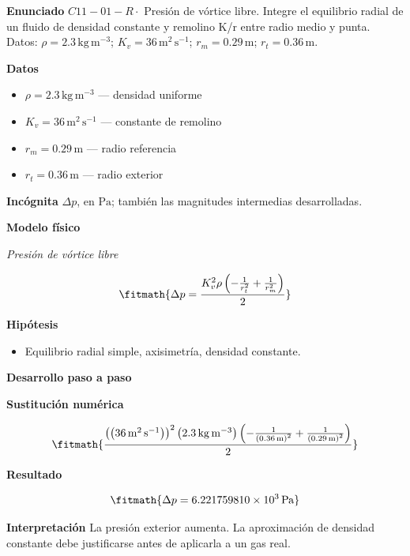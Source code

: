 \documentclass[10pt,openany]{book}
\begin{document}
\begin{tcolorbox}[title={Problema resuelto 1}, studiumworked, breakable]

\noindent\textbf{Enunciado}
\(C11-01-R \cdot\) Presión de vórtice libre. Integre el equilibrio radial de un fluido de densidad constante y remolino K/r entre radio medio y punta. Datos: \(\rho=2.3\, \mathrm{kg}\,\mathrm{m}^{-3}\); \(K_v=36\, \mathrm{m}^{2}\,\mathrm{s}^{-1}\); \(r_m=0.29\, \mathrm{m}\); \(r_t=0.36\, \mathrm{m}\).

\noindent\textbf{Datos}
\begin{itemize}
\item $\rho = 2.3\,\mathrm{kg}\,\mathrm{m}^{-3}$ — densidad uniforme
\item $K_v = 36\,\mathrm{m}^{2}\,\mathrm{s}^{-1}$ — constante de remolino
\item $r_m = 0.29\,\mathrm{m}$ — radio referencia
\item $r_t = 0.36\,\mathrm{m}$ — radio exterior
\end{itemize}

\noindent\textbf{Incógnita}
$\Delta p$, en $\mathrm{Pa}$; también las magnitudes intermedias desarrolladas.

\noindent\textbf{Modelo físico}

\noindent\textit{Presión de vórtice libre}

\[
\fitmath{\Delta p=\frac{K_v^{2} \rho \left(- \frac{1}{r_t^{2}} + \frac{1}{r_m^{2}}\right)}{2}}
\]

\noindent\textbf{Hipótesis}
\begin{itemize}
\item Equilibrio radial simple, axisimetría, densidad constante.
\end{itemize}

\noindent\textbf{Desarrollo paso a paso}



\noindent\textbf{Sustitución numérica}

\[
\fitmath{\frac{\left(\left(36\,\mathrm{m}^{2}\,\mathrm{s}^{-1}\right)\right)^{2} \left(2.3\,\mathrm{kg}\,\mathrm{m}^{-3}\right) \left(- \frac{1}{\left(0.36\,\mathrm{m}\right)^{2}} + \frac{1}{\left(0.29\,\mathrm{m}\right)^{2}}\right)}{2}}
\]

\noindent\textbf{Resultado}

\[
\fitmath{\Delta p=6.221759810\times10^{3}\,\mathrm{Pa}}
\]

\noindent\textbf{Interpretación}
La presión exterior aumenta. La aproximación de densidad constante debe justificarse antes de aplicarla a un gas real.


\end{tcolorbox}
\end{document}
